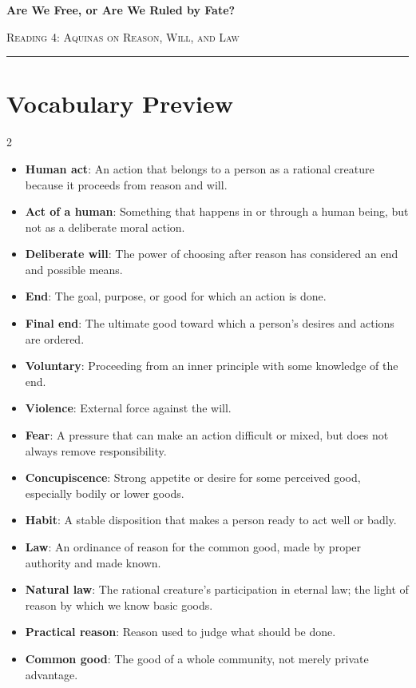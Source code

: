 \documentclass[12pt]{article}
\begin{document}
\begin{center}
{\LARGE\bfseries Are We Free, or Are We Ruled by Fate?}\par\vspace{0.25em}
{\large\scshape Reading 4: Aquinas on Reason, Will, and Law}\par\vspace{0.45em}
\rule{0.82\textwidth}{0.4pt}\par\vspace{0.7em}
\end{center}

\section*{Vocabulary Preview}
\begin{multicols}{2}
\begin{itemize}[leftmargin=*, itemsep=0.18em]
\item \textbf{Human act}: An action that belongs to a person as a rational creature because it proceeds from reason and will.
\item \textbf{Act of a human}: Something that happens in or through a human being, but not as a deliberate moral action.
\item \textbf{Deliberate will}: The power of choosing after reason has considered an end and possible means.
\item \textbf{End}: The goal, purpose, or good for which an action is done.
\item \textbf{Final end}: The ultimate good toward which a person's desires and actions are ordered.
\item \textbf{Voluntary}: Proceeding from an inner principle with some knowledge of the end.
\item \textbf{Violence}: External force against the will.
\item \textbf{Fear}: A pressure that can make an action difficult or mixed, but does not always remove responsibility.
\item \textbf{Concupiscence}: Strong appetite or desire for some perceived good, especially bodily or lower goods.
\item \textbf{Habit}: A stable disposition that makes a person ready to act well or badly.
\item \textbf{Law}: An ordinance of reason for the common good, made by proper authority and made known.
\item \textbf{Natural law}: The rational creature's participation in eternal law; the light of reason by which we know basic goods.
\item \textbf{Practical reason}: Reason used to judge what should be done.
\item \textbf{Common good}: The good of a whole community, not merely private advantage.
\end{itemize}
\end{multicols}
\end{document}
